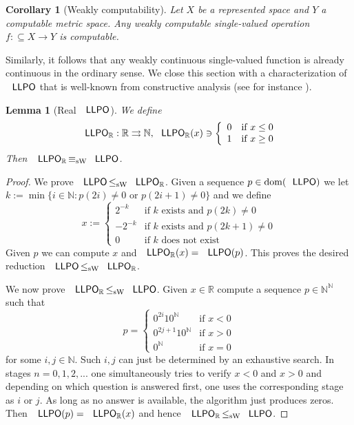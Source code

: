 \documentclass[jsl,10pt]{noasl}
\def\IN{{\mathbb{N}}}
\def\IR{{\mathbb{R}}}
\def\In{\subseteq}
\def\mto{\rightrightarrows}
\def\dom{{\rm dom}}
\def\LLPO{\text{\rm\sffamily LLPO}}
\def\LLPO{\text{\rm\sffamily LLPO}}
\def\leqSW{\mathop{\leq_{\mathrm{sW}}}}
\def\equivSW{\mathop{\equiv_{\mathrm{sW}}}}
\newtheorem{lemma}[proposition]{Lemma}
\newtheorem{corollary}[proposition]{Corollary}
\begin{document}
\begin{corollary}[Weakly computability]
\label{cor:single-valued-weakly-computable}
Let $X$ be a represented space and $Y$ a computable metric space.
Any weakly computable single-valued operation $f:\In X\to Y$ is computable.
\end{corollary}

Similarly, it follows that any weakly continuous single-valued function
is already continuous in the ordinary sense.
We close this section with a characterization of $\LLPO$ that is well-known
from constructive analysis (see for instance \cite{BR87a}).

\begin{lemma}[Real $\LLPO$]
We define 
\[\LLPO_\IR:\IR\mto\IN,\LLPO_\IR(x)\ni\left\{\begin{array}{ll}
       0 & \mbox{if $x\leq 0$}\\
       1 & \mbox{if $x\geq 0$}
       \end{array}\right.
\]
Then $\LLPO_\IR\equivSW\LLPO$.
\end{lemma}
\begin{proof}
We prove $\LLPO\leqSW\LLPO_\IR$. Given a sequence $p\in\dom(\LLPO)$
we let 
$k:=\min\{i\in\IN:p(2i)\not=0\mbox{ or }p(2i+1)\not=0\}$
and we define
\[x:=\left\{\begin{array}{ll}
2^{-k}  & \mbox{if $k$ exists and $p(2k)\not=0$}\\
-2^{-k} & \mbox{if $k$ exists and $p(2k+1)\not=0$}\\
0       & \mbox{if $k$ does not exist}
\end{array}\right.
\]
Given $p$ we can compute $x$ and $\LLPO_\IR(x)=\LLPO(p)$.
This proves the desired reduction $\LLPO\leqSW\LLPO_\IR$.

We now prove $\LLPO_\IR\leqSW\LLPO$. Given $x\in\IR$ 
compute a sequence $p\in\IN^\IN$ such that
\[p=\left\{\begin{array}{ll}
0^{2i}10^\IN  & \mbox{if $x<0$}\\
0^{2j+1}10^\IN & \mbox{if $x>0$}\\
0^\IN          & \mbox{if $x=0$}
\end{array}\right.\]
for some $i,j\in\IN$. 
Such $i,j$ can just be determined by an exhaustive search.
In stages $n=0,1,2,...$ one simultaneously tries to verify $x<0$ and $x>0$
and depending on which question is answered first, one uses the corresponding
stage as $i$ or $j$. As long as no answer is available, the algorithm
just produces zeros.
Then $\LLPO(p)=\LLPO_\IR(x)$ and hence
$\LLPO_\IR\leqSW\LLPO$.
\end{proof}
\end{document}
